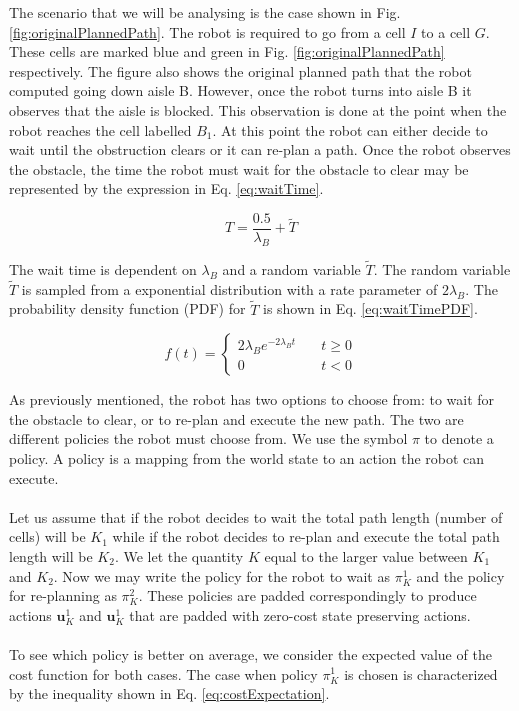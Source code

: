 \documentclass[a4paper,12pt]{article}
\begin{document}
			The scenario that we will be analysing is the case shown in Fig. \ref{fig:originalPlannedPath}. The robot is required to go from a cell $I$ to a cell $G$. These cells are marked blue and green in Fig. \ref{fig:originalPlannedPath} respectively. The figure also shows the original planned path that the robot computed going down aisle B. However, once the robot turns into aisle B it observes that the aisle is blocked. This observation is done at the point when the robot reaches the cell labelled $B_{1}$. At this point the robot can either decide to wait until the obstruction clears or it can re-plan a path. Once the robot observes the obstacle, the time the robot must wait for the obstacle to clear may be represented by the expression in Eq. \ref{eq:waitTime}. 

			\begin{equation}
				T=\frac{0.5}{\lambda_{B}}+\widetilde{T}
				\label{eq:waitTime}
			\end{equation}

			The wait time is dependent on $\lambda_{B}$ and a random variable $\widetilde{T}$. The random variable $\widetilde{T}$ is sampled from a exponential distribution with a rate parameter of $2\lambda_{B}$. The probability density function (PDF) for $\widetilde{T}$ is shown in Eq. \ref{eq:waitTimePDF}. 

			\begin{equation}
				f(t) = 
				\begin{cases}
				2\lambda_{B} e^{-2\lambda_{B} t} & \quad t \geq 0 \\
				0 & \quad t < 0
				\end{cases}
				\label{eq:waitTimePDF}
			\end{equation}
			
			As previously mentioned, the robot has two options to choose from: to wait for the obstacle to clear, or to re-plan and execute the new path. The two are different policies the robot must choose from. We use the symbol $\pi$ to denote a policy. A policy is a mapping from the world state to an action the robot can execute.
			\\
			\\
			Let us assume that if the robot decides to wait the total path length (number of cells) will be $K_1$ while if the robot decides to re-plan and execute the total path length will be $K_2$. We let the quantity $K$ equal to the larger value between $K_1$ and $K_2$. Now we may write the policy for the robot to wait as $\pi_{K}^{1}$ and the policy for re-planning as $\pi_{K}^{2}$. These policies are padded correspondingly to produce actions $\textbf{u}_{K}^{1}$ and $\textbf{u}_{K}^{1}$ that are padded with zero-cost state preserving actions.
			\\
			\\
			To see which policy is better on average, we consider the expected value of the cost function for both cases. The case when policy $\pi_{K}^{1}$ is chosen is characterized by the inequality shown in Eq. \ref{eq:costExpectation}.
\end{document}
